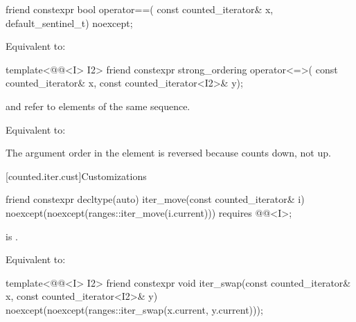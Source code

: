 %
\begin{itemdecl}
friend constexpr bool operator==(
  const counted_iterator& x, default_sentinel_t) noexcept;
\end{itemdecl}

\begin{itemdescr}
\pnum
\effects
Equivalent to: 
\end{itemdescr}

%
\begin{itemdecl}
template<@@<I> I2>
  friend constexpr strong_ordering operator<=>(
    const counted_iterator& x, const counted_iterator<I2>& y);
\end{itemdecl}

\begin{itemdescr}
\pnum
\expects
{} and  refer to
elements of the same sequence.

\pnum
\effects
Equivalent to: 

\pnum
\begin{note}
The argument order in the \effects element is reversed
because  counts down, not up.
\end{note}
\end{itemdescr}

[counted.iter.cust]{Customizations}

%
\begin{itemdecl}
friend constexpr decltype(auto)
  iter_move(const counted_iterator& i)
    noexcept(noexcept(ranges::iter_move(i.current)))
    requires @@<I>;
\end{itemdecl}

\begin{itemdescr}
\pnum
\hardexpects
{} is .

\pnum
\effects
Equivalent to: 
\end{itemdescr}

%
\begin{itemdecl}
template<@@<I> I2>
  friend constexpr void
    iter_swap(const counted_iterator& x, const counted_iterator<I2>& y)
      noexcept(noexcept(ranges::iter_swap(x.current, y.current)));
\end{itemdecl}

